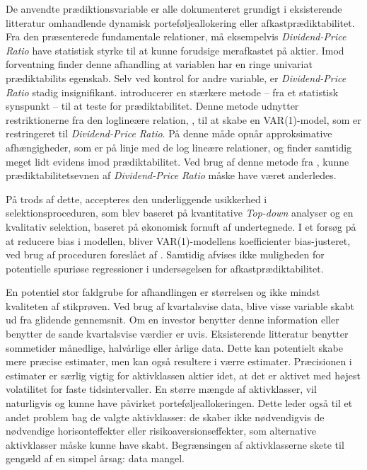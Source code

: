 \documentclass[
  a4paper,
  oneside]{memoir}
\begin{document}
De anvendte prædiktionsvariable er alle dokumenteret grundigt i eksisterende litteratur omhandlende dynamisk porteføljeallokering eller afkastprædiktabilitet. Fra den præsenterede fundamentale relationer, må eksempelvis \emph{Dividend-Price Ratio} have statistisk styrke til at kunne forudsige merafkastet på aktier. Imod forventning finder denne afhandling at variablen har en ringe univariat prædiktabilits egenskab. Selv ved kontrol for andre variable, er \emph{Dividend-Price Ratio} stadig insignifikant. \citep{Cochrane2008} introducerer en stærkere metode -- fra et statistisk synspunkt -- til at teste for prædiktabilitet. Denne metode udnytter restriktionerne fra den loglineære relation, \citep{Campbell1988}, til at skabe en VAR(1)-model, som er restringeret til \emph{Dividend-Price Ratio}. På denne måde opnår \citep{Cochrane2008} approksimative afhængigheder, som er på linje med de log lineære relationer, og finder samtidig meget lidt evidens imod prædiktabilitet. Ved brug af denne metode fra \citep{Cochrane2008}, kunne prædiktabilitetsevnen af \emph{Dividend-Price Ratio} måske have været anderledes.

På trods af dette, accepteres den underliggende usikkerhed i selektionsproceduren, som blev baseret på kvantitative \emph{Top-down} analyser og en kvalitativ selektion, baseret på økonomisk fornuft af undertegnede. I et forsøg på at reducere bias i modellen, bliver VAR(1)-modellens koefficienter bias-justeret, ved brug af proceduren foreslået af \citep{Pope1990}. Samtidig afvises ikke muligheden for potentielle spuriøse regressioner i undersøgelsen for afkastprædiktabilitet.

En potentiel stor faldgrube for afhandlingen er størrelsen og ikke mindst kvaliteten af stikprøven. Ved brug af kvartalsvise data, blive visse variable skabt ud fra glidende gennemsnit. Om en investor benytter denne information eller benytter de sande kvartalsvise værdier er uvis. Eksisterende litteratur benytter sommetider månedlige, halvårlige eller årlige data. Dette kan potentielt skabe mere præcise estimater, men kan også resultere i værre estimater. Præcisionen i estimater er særlig vigtig for aktivklassen aktier idet, at det er aktivet med højest volatilitet for faste tidsintervaller. En større mængde af aktivklasser, vil naturligvis og kunne have påvirket porteføljeallokeringen. Dette leder også til et andet problem bag de valgte aktivklasser: de skaber ikke nødvendigvis de nødvendige horisonteffekter eller risikoaversionseffekter, som alternative aktivklasser måske kunne have skabt. Begrænsingen af aktivklasserne skete til gengæld af en simpel årsag: data mangel.
\end{document}
